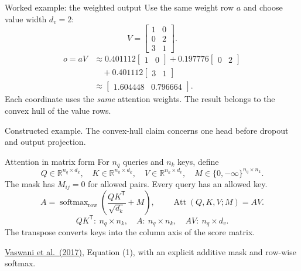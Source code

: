 \documentclass[aspectratio=169,11pt]{beamer}
\newcommand{\R}{\mathbb{R}}
\newcommand{\T}{\mathsf{T}}
\newcommand{\src}[1]{\par\vfill{\fontsize{7}{8.5}\selectfont\color{muted}#1}\par}
\newcommand{\paper}{\href{https://arxiv.org/abs/1706.03762}{Vaswani et al.\ (2017)}}
\DeclareMathOperator{\softmax}{softmax}
\DeclareMathOperator{\Att}{Att}
\begin{document}
\begin{frame}[t]{Worked example: the weighted output}
Use the same weight row $a$ and choose value width $d_v=2$:
\[V=\begin{bmatrix}1&0\\0&2\\3&1\end{bmatrix}.\]
\[
\begin{aligned}
  o=aV&\approx0.401112\begin{bmatrix}1&0\end{bmatrix}
    +0.197776\begin{bmatrix}0&2\end{bmatrix}\\
   &\quad+0.401112\begin{bmatrix}3&1\end{bmatrix}\\[1mm]
   &\approx\begin{bmatrix}1.604448&0.796664\end{bmatrix}.
\end{aligned}
\]
Each coordinate uses the \emph{same} attention weights.
The result belongs to the convex hull of the value rows.
\src{Constructed example. The convex-hull claim concerns one head before dropout and output projection.}
\end{frame}

\begin{frame}[t]{Attention in matrix form}
For $n_q$ queries and $n_k$ keys, define
\[
 Q\in\R^{n_q\times d_k},\quad K\in\R^{n_k\times d_k},\quad
 V\in\R^{n_k\times d_v},\quad M\in\{0,-\infty\}^{n_q\times n_k}.
\]
The mask has $M_{ij}=0$ for allowed pairs. Every query has an allowed key.
\[
 A=\softmax_{\mathrm{row}}\!\left(\frac{QK^{\T}}{\sqrt{d_k}}+M\right),
 \qquad \Att(Q,K,V;M)=AV.
\]
\[
 QK^{\T}:\ n_q\times n_k,\quad
 A:\ n_q\times n_k,\quad AV:\ n_q\times d_v.
\]
The transpose converts keys into the column axis of the score matrix.
\src{\paper, Equation (1), with an explicit additive mask and row-wise softmax.}
\end{frame}
\end{document}
